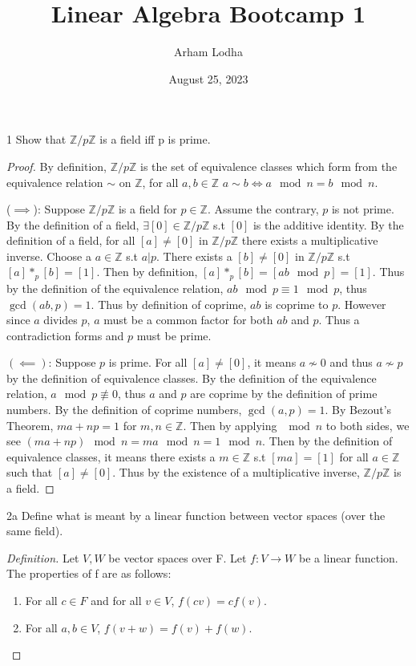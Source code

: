 \documentclass{article}
\newcommand{\Z}{\mathbb{Z}}
\newcommand{\rarr}[0]{\rightarrow}
\newenvironment{definition}
  {\renewcommand\qedsymbol{$\blacksquare$}\begin{proof}[Definition]}
  {\end{proof}}
\begin{document}
\title{Linear Algebra Bootcamp 1}
\author{Arham Lodha}%
\date{August 25, 2023}%
\maketitle

\begin{PROB}{1}\label{Problem 1.}
	Show that $\Z/p\Z$ is a field iff p is prime.
\end{PROB}
\begin{proof}

	

	By definition, $\Z/p\Z$ is the set of equivalence classes which form from the equivalence relation $\sim$ on $\Z$, for all $a, b \in \Z$ $a \sim b \iff a \mod n = b \mod n$.

	($\implies$): Suppose $\Z/p\Z$ is a field for $p \in \Z$. Assume the contrary, $p$ is not prime. By the definition of a field, $\exists [0] \in \Z/p\Z$ s.t $[0]$ is the additive identity. By the definition of a field, for all $[a] \neq [0]$ in $\Z/p\Z$ there exists a multiplicative inverse. Choose a $a \in \Z$ s.t $a | p$. There exists a $[b] \neq [0]$ in $\Z/p\Z$ s.t $[a] *_p [b] = [1]$. Then by definition, $[a] *_p [b] = [ab \mod p] = [1]$. Thus by the definition of the equivalence relation, $ab \mod p \equiv 1 \mod p$, thus $\gcd(ab,p) = 1$. Thus by definition of coprime, $ab$ is coprime to $p$. However since $a$ divides $p$, $a$ must be a common factor for both $ab$ and $p$. Thus a contradiction forms and $p$ must be prime.

	$(\impliedby)$: Suppose $p$ is prime. For all $[a] \neq [0]$, it means $a \nsim 0$ and thus $a \nsim p$ by the definition of equivalence classes. By the definition of the equivalence relation, $a \mod p \not\equiv 0$, thus $a$ and $p$ are coprime by the definition of prime numbers. By the definition of coprime numbers, $\gcd(a, p) = 1$. By Bezout's Theorem, $ma + np = 1$ for $m, n \in \Z$. Then by applying $\mod n$ to both sides, we see $(ma + np) \mod n = ma \mod n = 1 \mod n$. Then by the definition of equivalence classes, it means there exists a $m\in \Z$ s.t $[ma] = [1]$ for all $a \in \Z$ such that $[a] \neq [0]$. Thus by the existence of a multiplicative inverse, $\Z/p\Z$ is a field.


\end{proof}

\bigskip

\begin{PROB}{2a}\label{Problem 2a.}
	Define what is meant by a linear function between vector spaces (over the same field). 
\end{PROB}
\begin{definition}
	Let $V, W$ be vector spaces over F. Let $f: V \rarr W$ be a linear function. The properties of f are as follows:

	\begin{enumerate}
		\item For all $c \in F$ and for all $v \in V$, $f(cv) = cf(v)$.
		\item For all $a, b \in V$, $f(v + w) = f(v) + f(w)$.
	\end{enumerate}
\end{definition}
\end{document}
